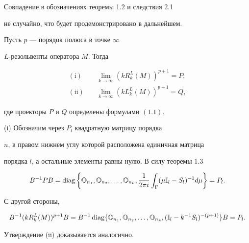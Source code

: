 \begin{notes}


Совпадение в обозначениях теоремы 1.2 и следствия 2.1 


не случайно, что будет продемонстрировано в дальнейшем.


\end{notes}





\begin{thms}


Пусть $p$ --- порядок полюса в точке $\infty$


$L$-резольвенты оператора $M$. Тогда


\begin{align}


\mathrm{(i)} \quad &\lim_{k\to\infty} (k R^L_k (M))^{p+1} = P; \\


%


\mathrm{(ii)}\quad & \lim_{k\to\infty} (k L^L_k (M))^{p+1} = Q,


\end{align}


где проекторы $P$ и $Q$ определены формулами $(1.1)$.


\end{thms}





\begin{pf}


(i) Обозначим через $P_l$ квадратную матрицу порядка


$n$, в правом нижнем углу которой расположена единичная матрица


порядка $l$, а остальные элементы равны нулю. В силу теоремы 1.3


$$


B^{-1} P B = \diag \bigg\{{\Bbb O}_{n_1},


{\Bbb O}_{n_2},\dotsc, {\Bbb O}_{n_k}, \frac{1}{2\pi


i}\int_{\Gamma} (\mu{\Bbb I}_l - S_l)^{-1} d\mu\bigg\} = P_l.


$$





С другой стороны,


$$


B^{-1} (k R_k^L (M))^{p+1} B = 


B^{-1}\diag \{{\Bbb O}_{n_1}, {\Bbb


O}_{n_2}, \dotsc, {\Bbb O}_{n_k}, ({\Bbb I}_l - k^{-1}


S_l)^{-(p+1)}\} B = P_l.


$$





Утверждение (ii) доказывается аналогично.


\end{pf}





